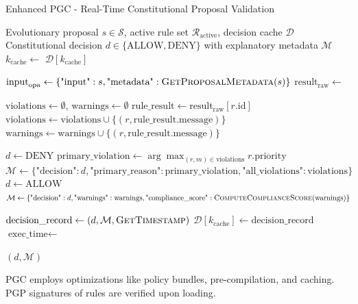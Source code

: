 \documentclass[sigconf,natbib]{acmart}
\makeatletter
\newcommand{\resetalglineno}{\setcounter{ALG@line}{0}}
\makeatother
\begin{document}
\begin{algorithm}[!htbp]
\resetalglineno
\caption{Enhanced PGC - Real-Time Constitutional Proposal Validation}
\label{alg:pgc_validation}
\begin{algorithmic}[1]
\Require Evolutionary proposal $s \in \mathcal{S}$, active rule set $\mathcal{R}_{\text{active}}$, decision cache $\mathcal{D}$
\Ensure Constitutional decision $d \in \{\text{ALLOW}, \text{DENY}\}$ with explanatory metadata $\mathcal{M}$
  \State $k_{\text{cache}} \gets$  
    \State {}
    \State \Return $\mathcal{D}[k_{\text{cache}}]$ 
  \EndIf

  \State $\text{input}_{\text{opa}} \gets \{\text{"input"}: s, \text{"metadata"}: \Call{GetProposalMetadata}{s}\}$
  \State $\text{result}_{\text{raw}} \gets$ 

  \State $\text{violations} \gets \emptyset$, $\text{warnings} \gets \emptyset$
    \State $\text{rule\_result} \gets \text{result}_{\text{raw}}[r.\text{id}]$
      \State $\text{violations} \gets \text{violations} \cup \{(r, \text{rule\_result}.\text{message})\}$
      \State $\text{warnings} \gets \text{warnings} \cup \{(r, \text{rule\_result}.\text{message})\}$
    \EndIf
  \EndFor

    \State $d \gets \text{DENY}$
    \State $\text{primary\_violation} \gets \arg\max_{(r,m) \in \text{violations}} r.\text{priority}$
    \State $\mathcal{M} \gets \{\text{"decision"}: d, \text{"primary\_reason"}: \text{primary\_violation}, \text{"all\_violations"}: \text{violations}\}$
  \Else
    \State $d \gets \text{ALLOW}$
    \State $\mathcal{M} \gets \{\text{"decision"}: d, \text{"warnings"}: \text{warnings}, \text{"compliance\_score"}: \Call{ComputeComplianceScore}{\text{warnings}}\}$
  \EndIf

  \State $\text{decision\_record} \gets (d, \mathcal{M}, \Call{GetTimestamp}{})$
  \State $\mathcal{D}[k_{\text{cache}}] \gets \text{decision\_record}$
  \State {}
  \State $\text{exec\_time} \gets$ 
  \State {}

  \State \Return $(d, \mathcal{M})$
\EndFunction
\end{algorithmic}
\end{algorithm}
PGC employs optimizations like policy bundles, pre-compilation, and caching. PGP signatures of rules are verified upon loading.
\end{document}
